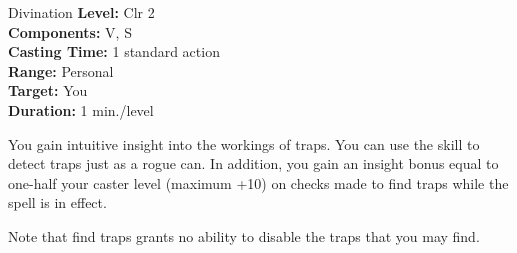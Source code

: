 {Divination}
{
	\textbf{Level:}
	Clr 2\\
	\textbf{Components:}
	V, S\\
	\textbf{Casting Time:}
	1 standard action\\
	\textbf{Range:}
	Personal\\
	\textbf{Target:}
	You\\
	\textbf{Duration:}
	1 min./level\\
}
{
	You gain intuitive insight into the workings of traps. You can use the  skill to detect traps just as a rogue can. In addition, you gain an insight bonus equal to one-half your caster level (maximum +10) on  checks made to find traps while the spell is in effect.

	Note that find traps grants no ability to disable the traps that you may find.

}
